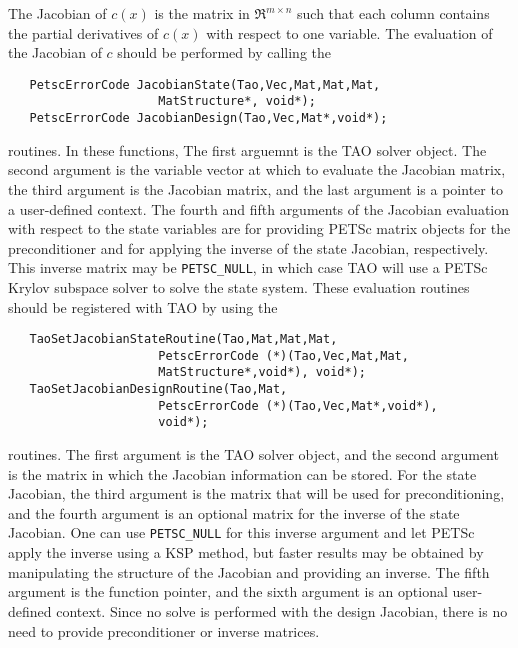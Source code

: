 The Jacobian of $c(x)$ is the matrix in $\Re^{m \times n}$ such that each 
column contains the partial derivatives of $c(x)$ with respect to one 
variable.  The evaluation of the Jacobian of $c$ should be performed 
by calling the 
\begin{verbatim}
   PetscErrorCode JacobianState(Tao,Vec,Mat,Mat,Mat,
                     MatStructure*, void*);
   PetscErrorCode JacobianDesign(Tao,Vec,Mat*,void*);
\end{verbatim}
routines. 
In these functions, The first arguemnt is the TAO solver object.  The second 
argument is the variable vector at which to 
evaluate the Jacobian matrix, the third argument is the Jacobian matrix,
and the last argument is a pointer to a user-defined context. The fourth
and
fifth arguments of the Jacobian evaluation with respect to the state
variables
are for providing PETSc matrix objects for the preconditioner and for
applying
the inverse of the state Jacobian, respectively.  This inverse matrix may be 
{\tt PETSC\_NULL}, in which case TAO will use a PETSc Krylov subspace 
solver to solve the state system.  These evaluation routines should be 
registered 
with TAO by using the 
\begin{verbatim}
   TaoSetJacobianStateRoutine(Tao,Mat,Mat,Mat,
                     PetscErrorCode (*)(Tao,Vec,Mat,Mat,
                     MatStructure*,void*), void*);
   TaoSetJacobianDesignRoutine(Tao,Mat,
                     PetscErrorCode (*)(Tao,Vec,Mat*,void*), 
                     void*);
\end{verbatim}
routines. 
The first argument is the TAO solver object, and the second argument is the
matrix 
in which the Jacobian information can be stored.  For the state Jacobian,
the 
third argument is the matrix that will be used for preconditioning, and the 
fourth argument is an optional matrix for the inverse of the state
Jacobian.
One can use {\tt PETSC\_NULL} for this inverse argument and let PETSc
apply 
the inverse using a KSP method, but faster results may be obtained by
manipulating the structure of the Jacobian and providing an inverse.
The fifth argument is the function pointer, and the sixth argument is
an optional user-defined context.  Since no solve is performed with the
design Jacobian, there is no need to provide preconditioner or inverse
matrices.


